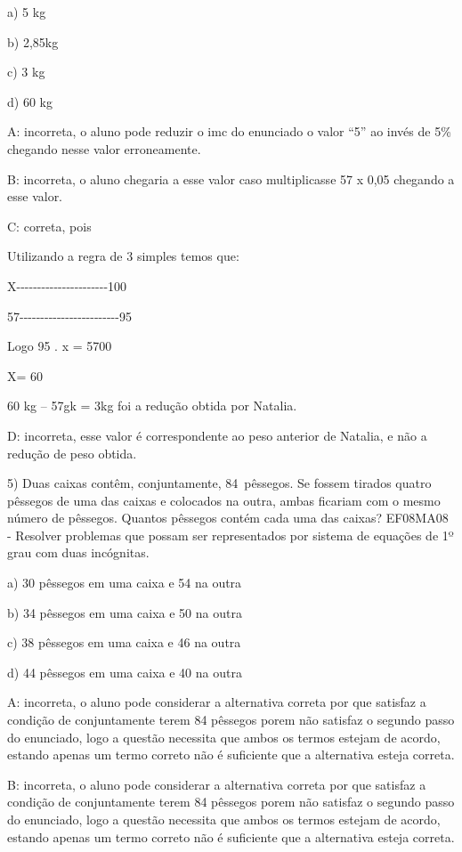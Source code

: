 a) 5 kg

b) 2,85kg

c) 3 kg

d) 60 kg

A: incorreta, o aluno pode reduzir o imc do enunciado o valor ``5'' ao
invés de 5\% chegando nesse valor erroneamente.

B: incorreta, o aluno chegaria a esse valor caso multiplicasse 57 x 0,05
chegando a esse valor.

C: correta, pois

Utilizando a regra de 3 simples temos que:

X-\/-\/-\/-\/-\/-\/-\/-\/-\/-\/-\/-\/-\/-\/-\/-\/-\/-\/-\/-\/-\/-100

57-\/-\/-\/-\/-\/-\/-\/-\/-\/-\/-\/-\/-\/-\/-\/-\/-\/-\/-\/-\/-\/-\/-\/-95

Logo 95 . x = 5700

X= 60

60 kg -- 57gk = 3kg foi a redução obtida por Natalia.

D: incorreta, esse valor é correspondente ao peso anterior de Natalia, e
não a redução de peso obtida.

5) Duas caixas contêm, conjuntamente, 84~pêssegos. Se fossem tirados
quatro pêssegos de uma das caixas e colocados na outra, ambas ficariam
com o mesmo número de pêssegos. Quantos pêssegos contém cada uma das
caixas? EF08MA08 - Resolver problemas que possam ser representados por
sistema de equações de 1º grau com duas incógnitas.

a) 30 pêssegos em uma caixa e 54 na outra

b) 34 pêssegos em uma caixa e 50 na outra

c) 38 pêssegos em uma caixa e 46 na outra

d) 44 pêssegos em uma caixa e 40 na outra

A: incorreta, o aluno pode considerar a alternativa correta por que
satisfaz a condição de conjuntamente terem 84 pêssegos porem não
satisfaz o segundo passo do enunciado, logo a questão necessita que
ambos os termos estejam de acordo, estando apenas um termo correto não é
suficiente que a alternativa esteja correta.

B: incorreta, o aluno pode considerar a alternativa correta por que
satisfaz a condição de conjuntamente terem 84 pêssegos porem não
satisfaz o segundo passo do enunciado, logo a questão necessita que
ambos os termos estejam de acordo, estando apenas um termo correto não é
suficiente que a alternativa esteja correta.

